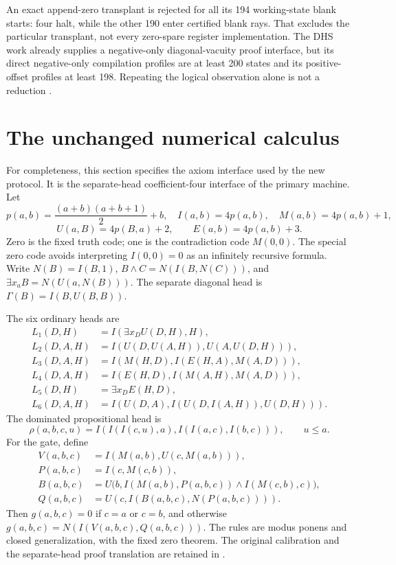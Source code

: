 \documentclass[11pt,letterpaper]{article}
\begin{document}
An exact append-zero transplant is rejected for all its 194 working-state
blank starts: four halt, while the other 190 enter certified blank rays.
That excludes the particular transplant, not every zero-spare register
implementation. The DHS work already supplies a negative-only
diagonal-vacuity proof interface, but its direct negative-only compilation
profiles are at least 200 states and its positive-offset profiles at
least 198. Repeating the logical observation alone is not a reduction
\cite{radix,active}.



\section{The unchanged numerical calculus}
\label{sec:calculus}

For completeness, this section specifies the axiom interface used by
the new protocol. It is the separate-head coefficient-four interface of
the primary machine. Let
\[
 p(a,b)=\frac{(a+b)(a+b+1)}{2}+b,\quad
 I(a,b)=4p(a,b),\quad M(a,b)=4p(a,b)+1,
\]
\[
 U(a,B)=4p(B,a)+2,\qquad E(a,b)=4p(a,b)+3.
\]
Zero is the fixed truth code; one is the contradiction code $M(0,0)$.
The special zero code avoids interpreting $I(0,0)=0$ as an infinitely
recursive formula. Write $N(B)=I(B,1)$,
$B\wedge C=N(I(B,N(C)))$, and
$\exists x_a B=N(U(a,N(B)))$.
The separate diagonal head is $\Gamma(B)=I(B,U(B,B))$.

The six ordinary heads are
\begin{align*}
L_1(D,H)&=I(\exists x_D U(D,H),H),\\
L_2(D,A,H)&=I(U(D,U(A,H)),U(A,U(D,H))),\\
L_3(D,A,H)&=I(M(H,D),I(E(H,A),M(A,D))),\\
L_4(D,A,H)&=I(E(H,D),I(M(A,H),M(A,D))),\\
L_5(D,H)&=\exists x_D E(H,D),\\
L_6(D,A,H)&=I(U(D,A),I(U(D,I(A,H)),U(D,H))).
\end{align*}
The dominated propositional head is
\[
 \rho(a,b,c,u)=I(I(I(c,u),a),I(I(a,c),I(b,c))),\qquad u\le a.
\]
For the gate, define
\begin{align*}
 V(a,b,c)&=I(M(a,b),U(c,M(a,b))),\\
 P(a,b,c)&=I(c,M(c,b)),\\
 B(a,b,c)&=U\bigl(b,I(M(a,b),P(a,b,c))\wedge I(M(c,b),c)\bigr),\\
 Q(a,b,c)&=U(c,I(B(a,b,c),N(P(a,b,c)))).
\end{align*}
Then $g(a,b,c)=0$ if $c=a$ or $c=b$, and otherwise
$g(a,b,c)=N(I(V(a,b,c),Q(a,b,c)))$.
The rules are modus ponens and closed generalization, with the fixed
zero theorem. The original calibration and the separate-head proof
translation are retained in 
\cite{calibration,separate}.
\end{document}

